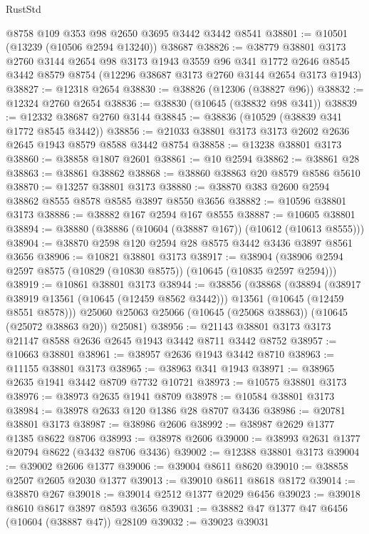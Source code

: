 \begin{lexlean}{RustStd}
\begin{coremodule}
    @8758
    @109
    @353
    @98
    @2650
    @3695
    @3442
    @3442
    @8541
@38801 := @10501 (@13239 (@10506 @2594 @13240)) @38687
@38826 := @38779
    @38801
    @3173
    @2760
    @3144
    @2654
    @98
    @3173
    @1943
    @3559
    @96
    @341
    @1772
    @2646
    @8545
    @3442
    @8579
    @8754
    (@12296 @38687 @3173 @2760 @3144 @2654 @3173 @1943)
@38827 := @12318 @2654
@38830 := @38826 (@12306 (@38827 @96))
@38832 := @12324 @2760 @2654
@38836 := @38830 (@10645 (@38832 @98 @341))
@38839 := @12332 @38687 @2760 @3144
@38845 := @38836 (@10529 (@38839 @341 @1772 @8545 @3442))
@38856 := @21033 @38801 @3173 @3173 @2602 @2636 @2645 @1943 @8579 @8588 @3442 @8754
@38858 := @13238 @38801 @3173
@38860 := @38858 @1807 @2601
@38861 := @10 @2594
@38862 := @38861 @28
@38863 := @38861 @38862
@38868 := @38860 @38863 @20 @8579 @8586 @5610
@38870 := @13257 @38801 @3173
@38880 := @38870 @383 @2600 @2594 @38862 @8555 @8578 @8585 @3897 @8550 @3656
@38882 := @10596 @38801 @3173
@38886 := @38882 @167 @2594 @167 @8555
@38887 := @10605 @38801
@38894 := @38880 (@38886 (@10604 (@38887 @167)) (@10612 (@10613 @8555)))
@38904 := @38870 @2598 @120 @2594 @28 @8575 @3442 @3436 @3897 @8561 @3656
@38906 := @10821 @38801 @3173
@38917 := @38904 (@38906 @2594 @2597 @8575 (@10829 (@10830 @8575)) (@10645 (@10835 @2597 @2594)))
@38919 := @10861 @38801 @3173
@38944 := @38856
    (@38868
      (@38894
        (@38917 @38919 @13561 (@10645 (@12459 @8562 @3442)))
        @13561
        (@10645 (@12459 @8551 @8578)))
      @25060
      @25063
      @25066
      (@10645 (@25068 @38863))
      (@10645 (@25072 @38863 @20))
      @25081)
@38956 := @21143 @38801 @3173 @3173 @21147 @8588 @2636 @2645 @1943 @3442 @8711 @3442 @8752
@38957 := @10663 @38801
@38961 := @38957 @2636 @1943 @3442 @8710
@38963 := @11155 @38801 @3173
@38965 := @38963 @341 @1943
@38971 := @38965 @2635 @1941 @3442 @8709 @7732 @10721
@38973 := @10575 @38801 @3173
@38976 := @38973 @2635 @1941 @8709
@38978 := @10584 @38801 @3173
@38984 := @38978 @2633 @120 @1386 @28 @8707 @3436
@38986 := @20781 @38801 @3173
@38987 := @38986 @2606
@38992 := @38987 @2629 @1377 @1385 @8622 @8706
@38993 := @38978 @2606
@39000 := @38993 @2631 @1377 @20794 @8622 (@3432 @8706 @3436)
@39002 := @12388 @38801 @3173
@39004 := @39002 @2606 @1377
@39006 := @39004 @8611 @8620
@39010 := @38858 @2507 @2605 @2030 @1377
@39013 := @39010 @8611 @8618 @8172
@39014 := @38870 @267
@39018 := @39014 @2512 @1377 @2029 @6456
@39023 := @39018 @8610 @8617 @3897 @8593 @3656
@39031 := @38882 @47 @1377 @47 @6456 (@10604 (@38887 @47)) @28109
@39032 := @39023 @39031

\end{coremodule}
\end{lexlean}
